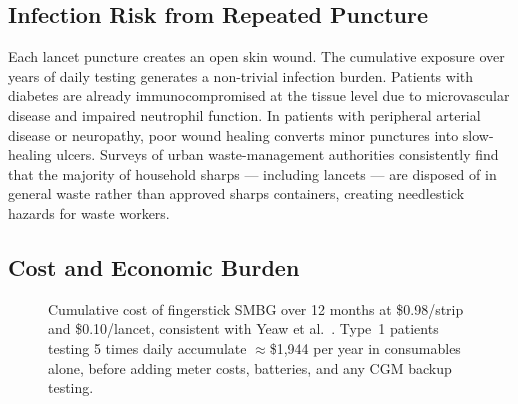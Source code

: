 \subsection*{Infection Risk from Repeated Puncture}

Each lancet puncture creates an open skin wound. The cumulative exposure over years of daily testing generates a non-trivial infection burden. Patients with diabetes are already immunocompromised at the tissue level due to microvascular disease and impaired neutrophil function. In patients with peripheral arterial disease or neuropathy, poor wound healing converts minor punctures into slow-healing ulcers. Surveys of urban waste-management authorities consistently find that the majority of household sharps --- including lancets --- are disposed of in general waste rather than approved sharps containers, creating needlestick hazards for waste workers.

\subsection*{Cost and Economic Burden}

\begin{figure}[H]
\centering
{}
\caption{Cumulative cost of fingerstick SMBG over 12 months at \$0.98/strip and \$0.10/lancet, consistent with Yeaw et al.~\cite{yeaw2012}. Type~1 patients testing 5 times daily accumulate $\approx$\$1,944 per year in consumables alone, before adding meter costs, batteries, and any CGM backup testing.}
\label{fig:fingerstick_cost}
\end{figure}

